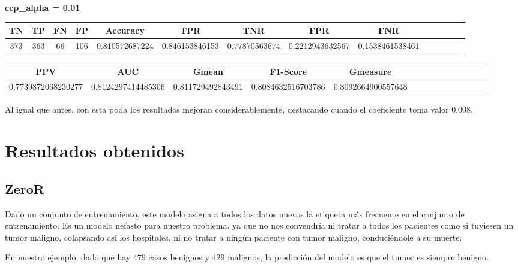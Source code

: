 \documentclass[a4]{article}
\begin{document}
\textbf{ccp\_alpha = 0.01}
\begin{center}
\begin{tabular}{|c|c|c|c|c|c|c|c|c|c|c|c|c|c|}
\hline
\multicolumn{1}{|c|}{\textbf{TN}}& \textbf{TP} & \textbf{FN} & \textbf{FP} & \textbf{Accuracy} & \textbf{TPR} & \textbf{TNR} & \textbf{FPR} &\textbf{FNR} \\ \hline
  373 & 363 & 66 & 106 & 0.810572687224 & 0.846153846153 & 0.77870563674 & 0.2212943632567 & 0.1538461538461 \\ \hline
\end{tabular}
\end{center}

\begin{center}
\begin{tabular}{|c|c|c|c|c|c|c|c|c|c|c|c|c|c|}
\hline
\multicolumn{1}{|c|}{\textbf{PPV}} & \textbf{AUC} & \textbf{Gmean} & \textbf{F1-Score} & \textbf{Gmeasure}  \\ \hline
  0.7739872068230277 & 0.8124297414485306 & 0.811729492843491 & 0.8084632516703786 & 0.8092664900557648 \\ \hline
\end{tabular}
\end{center}

\vspace{5mm}

Al igual que antes, con esta poda los resultados mejoran considerablemente, destacando cuando el coeficiente toma valor $0.008$.

\section{Resultados obtenidos}

\subsection{ZeroR}

Dado un conjunto de entrenamiento, este modelo asigna a todos los datos nuevos la etiqueta más frecuente en el conjunto de entrenamiento. Es un modelo nefasto para nuestro problema, ya que no nos convendría ni tratar a todos los pacientes como si tuviesen un tumor maligno, colapsando así los hospitales, ni no tratar a ningún paciente con tumor maligno, conduciéndole a su muerte.

En nuestro ejemplo, dado que hay $479$ casos benignos y $429$ malignos, la predicción del modelo es que el tumor es siempre benigno.
\end{document}
